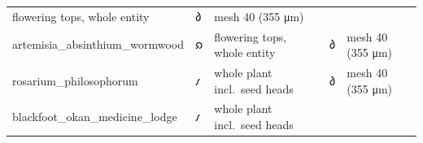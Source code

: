 \documentclass[12pt,a4paper]{article}
\begin{document}
\begin{longtable}[]{@{}lllll@{}}
\begin{minipage}[t]{0.17\columnwidth}
flowering tops, whole entity\strut
\end{minipage} & \begin{minipage}[t]{0.17\columnwidth}\raggedright
𐑔\strut
\end{minipage} & \begin{minipage}[t]{0.17\columnwidth}\raggedright
mesh 40 (355 μm)\strut
\end{minipage}\tabularnewline
\begin{minipage}[t]{0.17\columnwidth}\raggedright
artemisia\_absinthium\_wormwood\strut
\end{minipage} & \begin{minipage}[t]{0.17\columnwidth}\raggedright
𐑸\strut
\end{minipage} & \begin{minipage}[t]{0.17\columnwidth}\raggedright
flowering tops, whole entity\strut
\end{minipage} & \begin{minipage}[t]{0.17\columnwidth}\raggedright
𐑔\strut
\end{minipage} & \begin{minipage}[t]{0.17\columnwidth}\raggedright
mesh 40 (355 μm)\strut
\end{minipage}\tabularnewline
\begin{minipage}[t]{0.17\columnwidth}\raggedright
rosarium\_philosophorum\strut
\end{minipage} & \begin{minipage}[t]{0.17\columnwidth}\raggedright
𐑥\strut
\end{minipage} & \begin{minipage}[t]{0.17\columnwidth}\raggedright
whole plant incl.~seed heads\strut
\end{minipage} & \begin{minipage}[t]{0.17\columnwidth}\raggedright
𐑔\strut
\end{minipage} & \begin{minipage}[t]{0.17\columnwidth}\raggedright
mesh 40 (355 μm)\strut
\end{minipage}\tabularnewline
\begin{minipage}[t]{0.17\columnwidth}\raggedright
blackfoot\_okan\_medicine\_lodge\strut
\end{minipage} & \begin{minipage}[t]{0.17\columnwidth}\raggedright
𐑥\strut
\end{minipage} & \begin{minipage}[t]{0.17\columnwidth}\raggedright
whole plant incl.~seed heads\strut

\end{minipage}
\end{longtable}
\end{document}
